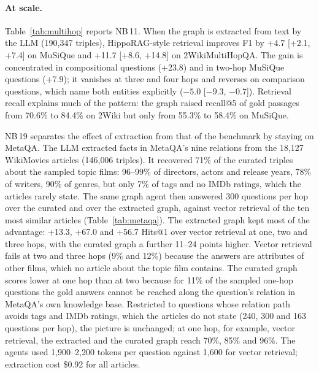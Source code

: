 \documentclass[11pt,a4paper]{article}
\newcommand{\nb}[1]{NB\,#1}
\begin{document}
\paragraph{At scale.} Table~\ref{tab:multihop} reports \nb{11}. When the graph is extracted from text by the LLM
(190{,}347 triples), HippoRAG-style retrieval improves F1 by +4.7 [+2.1, +7.4] on MuSiQue and +11.7
[+8.6, +14.8] on 2WikiMultiHopQA. The gain is concentrated in compositional questions (+23.8) and in two-hop
MuSiQue questions (+7.9); it vanishes at three and four hops and reverses on comparison questions, which name
both entities explicitly ($-5.0$ [$-9.3$, $-0.7$]). Retrieval recall explains much of the pattern: the graph
raised recall@5 of gold passages from 70.6\% to 84.4\% on 2Wiki but only from 55.3\% to 58.4\% on MuSiQue.

\nb{19} separates the effect of extraction from that of the benchmark by staying on MetaQA. The LLM extracted facts
in MetaQA's nine relations from the 18{,}127 WikiMovies articles (146{,}006 triples). It recovered 71\% of the curated
triples about the sampled topic films: 96--99\% of directors, actors and release years, 78\% of writers, 90\% of
genres, but only 7\% of tags and no IMDb ratings, which the articles rarely state. The same graph agent then answered
300 questions per hop over the curated and over the extracted graph, against vector retrieval of the ten most similar
articles (Table~\ref{tab:metaqa}). The extracted graph kept most of the advantage: +13.3, +67.0 and +56.7 Hits@1 over
vector retrieval at one, two and three hops, with the curated graph a further 11--24 points higher. Vector retrieval
fails at two and three hops (9\% and 12\%) because the answers are attributes of other films, which no article about
the topic film contains. The curated graph scores lower at one hop than at two because for 11\% of the sampled
one-hop questions the gold answers cannot be reached along the question's relation in MetaQA's own knowledge base.
Restricted to questions whose relation path avoids tags and IMDb ratings, which the articles do not state (240, 300
and 163 questions per hop), the picture is unchanged; at one hop, for example, vector retrieval, the extracted and
the curated graph reach 70\%, 85\% and 96\%. The agents used 1{,}900--2{,}200 tokens per question against 1{,}600 for vector retrieval;
extraction cost \$0.92 for all articles.
\end{document}
